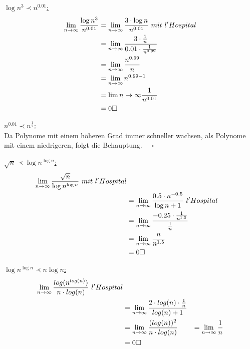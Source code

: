 \documentclass{article}
\begin{document}
\begin{enumerate}
\underline{$\log n^3 \prec n^{0.01}$:} \\
\begin{align*}
    \lim_{n \to \infty} \frac{\log n^3}{n^{0.01}} &= \lim_{n \to \infty}
        \frac{3 \cdot \log n}{n^{0.01}} ~mit~l 'Hospital\\
        &= \lim_{n \to \infty} \frac{3 \cdot \frac{1}{n}}{0.01 \cdot \frac{1}{n^{0.99}}} \\
        &= \lim_{n \to \infty} \frac{n^{0.99}}{n} \\
	&= \lim_{n \to \infty} n^{0.99-1} \\
	&= \lim {n \to \infty} \frac{1}{n^{0.01}} \\
	&= 0 \hfill \square
\end{align*}

\underline{$n^{0.01} \prec n^{\frac{1}{2}}$:} \\
Da Polynome mit einem höheren Grad immer schneller wachsen, als
Polynome mit einem niedrigeren, folgt die Behauptung. $\quad \square$

\underline{$\sqrt{n} \prec \log n^{\log n}$:} \\
\begin{align*}
\lim_{n \to \infty} \frac{\sqrt{n}}{\log n^{ \log n}} ~mit~l'Hospital\\
	&= \lim_{n \to \infty} \frac{0.5 \cdot n^{-0.5}}{\log n +1} ~l 'Hospital\\
        &= \lim_{n \to \infty} \frac{-0.25 \cdot \frac{1}{n^{1.5}}}{\frac{1}{n}}  \\
	&= \lim_{n \to \infty} \frac{n}{n^{1.5}} \\
        &= 0 \hfill \square
\end{align*}


\underline{$\log n^{\log n} \prec n \log n$:} \\
\begin{align*}
\lim_{n \to \infty} \frac{log (n^{log (n)})}{n \cdot log (n)} ~l'Hospital\\    
	&=\lim_{n \to \infty} \frac{2 \cdot log(n) \cdot \frac{1}{n}}{log(n)+1} \\
	&=\lim_{n \to \infty} \frac{(log(n))^2}{n \cdot log(n)}
	&=\lim_{n \to \infty} \frac{1}{n} \\
	&= 0 \hfill \square
\end{align*}



\end{enumerate}
\end{document}
